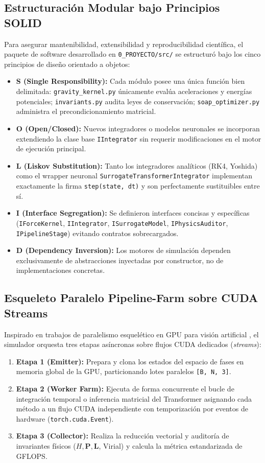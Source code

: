 \documentclass[11pt,a4paper]{article}
\begin{document}
\subsection{Estructuración Modular bajo Principios SOLID}
Para asegurar mantenibilidad, extensibilidad y reproducibilidad científica, el paquete de software desarrollado en \texttt{0\_PROYECTO/src/} se estructuró bajo los cinco principios de diseño orientado a objetos:
\begin{itemize}
    \item \textbf{S (Single Responsibility):} Cada módulo posee una única función bien delimitada: \texttt{gravity\_kernel.py} únicamente evalúa aceleraciones y energías potenciales; \texttt{invariants.py} audita leyes de conservación; \texttt{soap\_optimizer.py} administra el precondicionamiento matricial.
    \item \textbf{O (Open/Closed):} Nuevos integradores o modelos neuronales se incorporan extendiendo la clase base \texttt{IIntegrator} sin requerir modificaciones en el motor de ejecución principal.
    \item \textbf{L (Liskov Substitution):} Tanto los integradores analíticos (RK4, Yoshida) como el wrapper neuronal \texttt{SurrogateTransformerIntegrator} implementan exactamente la firma \texttt{step(state, dt)} y son perfectamente sustituibles entre sí.
    \item \textbf{I (Interface Segregation):} Se definieron interfaces concisas y específicas (\texttt{IForceKernel}, \texttt{IIntegrator}, \texttt{ISurrogateModel}, \texttt{IPhysicsAuditor}, \texttt{IPipelineStage}) evitando contratos sobrecargados.
    \item \textbf{D (Dependency Inversion):} Los motores de simulación dependen exclusivamente de abstracciones inyectadas por constructor, no de implementaciones concretas.
\end{itemize}

\subsection{Esqueleto Paralelo Pipeline-Farm sobre CUDA Streams}
Inspirado en trabajos de paralelismo esquelético en GPU para visión artificial \cite{aroni2025optimizing}, el simulador orquesta tres etapas asíncronas sobre flujos CUDA dedicados (\textit{streams}):
\begin{enumerate}
    \item \textbf{Etapa 1 (Emitter):} Prepara y clona los estados del espacio de fases en memoria global de la GPU, particionando lotes paralelos \texttt{[B, N, 3]}.
    \item \textbf{Etapa 2 (Worker Farm):} Ejecuta de forma concurrente el bucle de integración temporal o inferencia matricial del Transformer asignando cada método a un flujo CUDA independiente con temporización por eventos de hardware (\texttt{torch.cuda.Event}).
    \item \textbf{Etapa 3 (Collector):} Realiza la reducción vectorial y auditoría de invariantes físicos ($H, \mathbf{P}, \mathbf{L}$, Virial) y calcula la métrica estandarizada de GFLOPS.
\end{enumerate}
\end{document}
